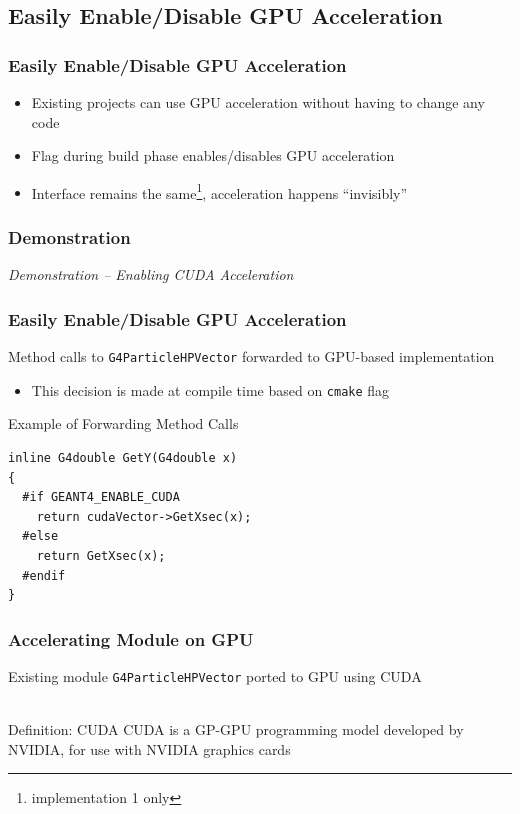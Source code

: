 \documentclass{beamer}
\begin{document}
\subsection{Easily Enable/Disable GPU Acceleration}
\begin{frame}
\frametitle{Easily Enable/Disable GPU Acceleration}
\begin{itemize}
\item Existing projects can use GPU acceleration without having to change any code 
\item Flag during build phase enables/disables GPU acceleration
\item Interface remains the same\footnote{implementation 1 only}, acceleration happens ``invisibly''
\end{itemize}
\end{frame}

\begin{frame}
\frametitle{Demonstration}
\begin{center}
\emph{Demonstration -- Enabling CUDA Acceleration}
\end{center}
\end{frame}

\begin{frame}[fragile]
\frametitle{Easily Enable/Disable GPU Acceleration}
Method calls to \texttt{G4ParticleHPVector} forwarded to GPU-based implementation
\begin{itemize}
\item This decision is made at compile time based on \texttt{cmake} flag
\end{itemize}

\begin{block}{Example of Forwarding Method Calls}
\begin{lstlisting}
inline G4double GetY(G4double x)
{
  #if GEANT4_ENABLE_CUDA
    return cudaVector->GetXsec(x);
  #else
    return GetXsec(x);
  #endif
}
\end{lstlisting}
\end{block}
\end{frame}

\begin{frame}
\frametitle{Accelerating Module on GPU}
Existing module \texttt{G4ParticleHPVector} ported to GPU using CUDA\\~\\

\begin{block}{Definition: CUDA}
CUDA is a GP-GPU programming model developed by NVIDIA, for use with NVIDIA graphics cards
\end{block}
\end{frame}
\end{document}
